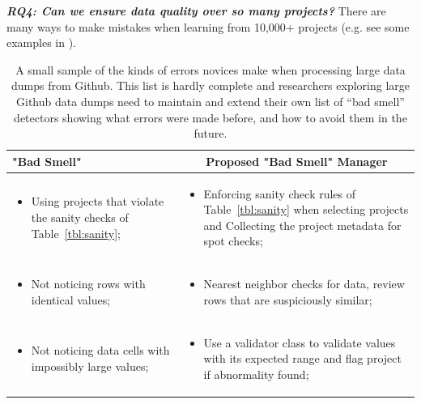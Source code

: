 \noindent\textit{\textbf{RQ4: Can we ensure data quality over so many projects?}}  There are many ways to make mistakes when learning from 10,000+ projects
(e.g. see some examples  in ).
\begin{table}[!t]
\caption{A small sample of the kinds of errors novices make when processing large data dumps from Github. This list is hardly complete and researchers exploring large Github data dumps need to maintain and extend their own list of ``bad smell'' detectors showing what errors were made before, and how to avoid them in the future. }\label{tbl:ohshit}
{\small \begin{tabular}{|p{.45\linewidth}p{.50\linewidth}|}\hline
\rowcolor{blue!10}
\centering \textbf{"Bad Smell"} & \multicolumn{1}{c}{\textbf{Proposed "Bad Smell" Manager}} \\ \hline
\rowcolor{white!10}
  \begin{itemize} 
\item
Using projects that violate the sanity checks of Table~\ref{tbl:sanity};
\end{itemize} &   \begin{itemize} 
\item
Enforcing sanity check rules of Table~\ref{tbl:sanity} when selecting projects and  Collecting the project metadata for spot checks;
\end{itemize} \\

\rowcolor{blue!10}
\small \begin{itemize} 
\item
Not noticing rows with identical values;
\end{itemize} & \begin{itemize} 
\item
Nearest neighbor checks for data, review rows that are suspiciously similar;
\end{itemize} \\

\rowcolor{white!10}
\small \begin{itemize} 
\item
Not noticing  data cells with impossibly large values;
\end{itemize} & \begin{itemize} 
\item
Use a validator class to validate values with its expected range and flag project if abnormality found;
\end{itemize} \\


\end{tabular}}
\end{table}
